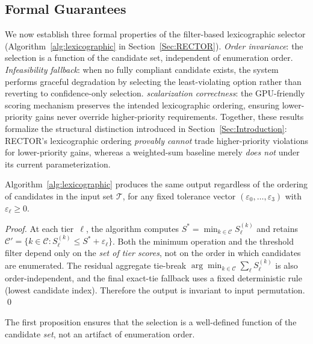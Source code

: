 \subsection{Formal Guarantees}
\label{subsec:formal_guarantees}

We now establish three formal properties of the filter-based lexicographic selector (Algorithm~\ref{alg:lexicographic} in Section~\ref{Sec:RECTOR}). \emph{Order invariance}: the selection is a function of the candidate set, independent of enumeration order. \emph{Infeasibility fallback}: when no fully compliant candidate exists, the system performs graceful degradation by selecting the least-violating option rather than reverting to confidence-only selection. \emph{scalarization correctness}: the GPU-friendly scoring mechanism preserves the intended lexicographic ordering, ensuring lower-priority gains never override higher-priority requirements. Together, these results formalize the structural distinction introduced in Section~\ref{Sec:Introduction}: \textsc{RECTOR}'s lexicographic ordering \emph{provably cannot} trade higher-priority violations for lower-priority gains, whereas a weighted-sum baseline merely \emph{does not} under its current parameterization.

\begin{proposition}
\label{thm:order_invariance}
Algorithm~\ref{alg:lexicographic} produces the same output regardless of the ordering of candidates in the input set $\mathcal{T}$, for any fixed tolerance vector $(\varepsilon_0,\ldots,\varepsilon_3)$ with $\varepsilon_\ell \geq 0$.
\end{proposition}
\begin{proof}
At each tier~$\ell$, the algorithm computes $S^* = \min_{k \in \mathcal{C}} S_\ell^{(k)}$ and retains $\mathcal{C}' = \{k \in \mathcal{C} : S_\ell^{(k)} \leq S^* + \varepsilon_\ell\}$. Both the minimum operation and the threshold filter depend only on the \emph{set of tier scores}, not on the order in which candidates are enumerated. The residual aggregate tie-break $\arg\min_{k \in \mathcal{C}}\sum_{\ell} S_\ell^{(k)}$ is also order-independent, and the final exact-tie fallback uses a fixed deterministic rule (lowest candidate index). Therefore the output is invariant to input permutation. \qed
\end{proof}

The first proposition ensures that the selection is a well-defined function of the candidate \emph{set}, not an artifact of enumeration order.

